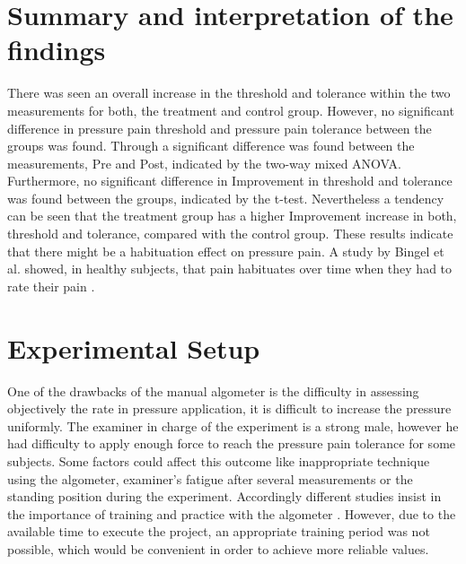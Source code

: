 \section{Summary and interpretation of the findings}
There was seen an overall increase in the threshold and tolerance within the two measurements for both, the treatment and control group. However, no significant difference in pressure pain threshold and pressure pain tolerance between the groups was found. Through a significant difference was found between the measurements, Pre and Post, indicated by the two-way mixed ANOVA. Furthermore, no significant difference in Improvement in threshold and tolerance was found between the groups, indicated by the t-test. Nevertheless a tendency can be seen that the treatment group has a higher Improvement increase in both, threshold and tolerance, compared with the control group. These results indicate that there might be a habituation effect on pressure pain. 
A study by Bingel et al. \cite{Bingel2007} showed, in healthy subjects, that pain habituates over time when they had to rate their pain \cite{Bingel2007}. 

\section{Experimental Setup}
One of the drawbacks of the manual algometer is the difficulty in assessing objectively the rate in pressure application, it is difficult to increase the pressure uniformly. The examiner in charge of the experiment is a strong male, however he had difficulty to apply enough force to reach the pressure pain tolerance for some subjects. Some factors could affect this outcome like inappropriate technique using the algometer, examiner's fatigue after several measurements or the standing position during the experiment. Accordingly different studies insist in the importance of training and practice with the algometer \cite{Kinser2009}. However, due to the available time to execute the project, an appropriate training period was not possible, which would be convenient in order to achieve  more reliable values.

